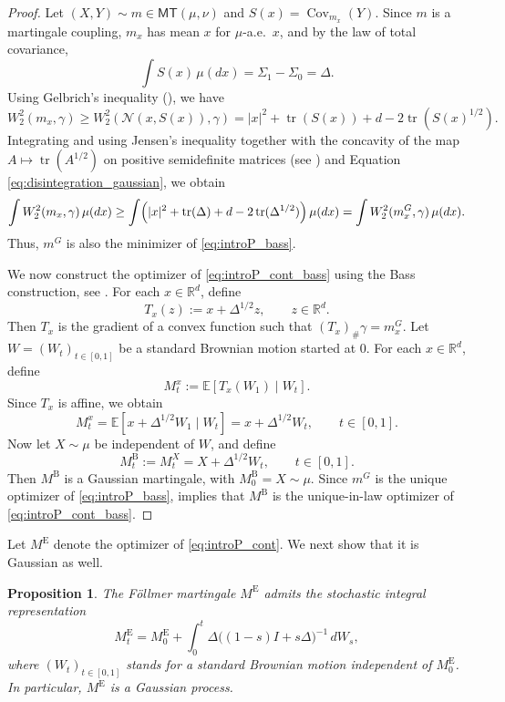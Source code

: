 \documentclass[reqno, a4paper]{amsart}
\DeclareMathOperator{\tr}{tr}
\theoremstyle{plain}
\newtheorem{proposition}[theorem]{Proposition}
\theoremstyle{definition}
\theoremstyle{remark}
\numberwithin{equation}{section}
\numberwithin{theorem}{section}
\newcommand{\R}{\mathbb{R}}
\newcommand{\E}{\mathbb{E}}
\newcommand{\MT}{\mathsf{MT}}
\DeclareMathOperator{\Cov}{Cov}
\begin{document}
	
	\begin{proof}
		Let $(X,Y) \sim m \in\MT(\mu,\nu)$ and $
		S(x)=\Cov_{m_x}(Y)$. %
		Since $m$ is a martingale coupling, $m_x$ has mean $x$ for $\mu$-a.e.\ $x$, and by the law of total covariance,
		\[
		\int S(x)\,\mu(dx)=\Sigma_1-\Sigma_0=\Delta.
		\]
		Using Gelbrich's inequality (\cite[Theorem~2.1]{Ge90}), we have
		\[
		W_2^2(m_x,\gamma)\ge W_2^2(\mathcal N(x,S(x)),\gamma)
		=|x|^2+\tr(S(x))+d-2\tr(S(x)^{1/2}).
		\]
		Integrating and using Jensen's inequality together with the concavity of the map $A\mapsto \tr(A^{1/2})$ on positive semidefinite matrices (see \cite[Theorem~4.2.3]{Bh07}) and Equation \eqref{eq:disintegration_gaussian}, we obtain 
		\[
		\int W_2^2(m_x,\gamma)\,\mu(dx)
		\ge
		\int \Bigl(|x|^2+\tr(\Delta)+d-2\tr(\Delta^{1/2})\Bigr)\,\mu(dx)=\int W_2^2(m_x^G,\gamma)\,\mu(dx).
		\]
		Thus, $m^G$ is also the minimizer of \eqref{eq:introP_bass}.
		
		We now construct the optimizer of \eqref{eq:introP_cont_bass} using the Bass construction, see \cite[Remark~2.3]{BaBeHuKa20}. For each $x\in\R^d$, define
		\[
		T_x(z):=x+\Delta^{1/2}z,
		\qquad z\in\R^d.
		\]
		Then $T_x$ is the gradient of a convex function such that $(T_x)_\#\gamma=m_x^G$.
		Let $W=(W_t)_{t\in[0,1]}$ be a standard Brownian motion started at $0$. For each $x\in\R^d$, define
		\[
		M_t^x:=\E[T_x(W_1)\mid W_t].
		\]
		Since $T_x$ is affine, we obtain
		\[
		M_t^x
		=
		\E[x+\Delta^{1/2}W_1\mid W_t]
		=
		x+\Delta^{1/2}W_t,
		\qquad t\in[0,1].
		\]
		Now let $X\sim\mu$ be independent of $W$, and define
		\[
		M^{\mathrm{B}}_t:=M_t^X=X+\Delta^{1/2}W_t,
		\qquad t\in[0,1].
		\]
		Then $M^{\mathrm{B}}$ is a Gaussian martingale, with
		$M^{\mathrm{B}}_0=X\sim\mu$. Since $m^G$ is the unique optimizer of \eqref{eq:introP_bass}, \cite[Theorem~2.2]{BaBeHuKa20} implies that $M^{\mathrm{B}}$ is the unique-in-law optimizer of \eqref{eq:introP_cont_bass}.
	\end{proof}
	
	
	Let $M^{\mathrm E}$ denote the optimizer of \eqref{eq:introP_cont}. We next show that it is Gaussian as well.
	
	\begin{proposition}\label{pro:computation_gauss_Föllmer}
        The Föllmer martingale $M^{\mathrm E}$ admits the stochastic integral representation
		\begin{equation}\label{eq:M^E_t}
			M_t^{\mathrm E}
			=
			M_0^{\mathrm E}
			+\int_0^t \Delta\bigl((1-s)I+s\Delta\bigr)^{-1}\,dW_s,
		\end{equation}
        where $(W_t)_{t \in [0,1]}$ stands for a standard Brownian motion independent of $M_0^{\mathrm E}$. In particular, $M^{\mathrm E}$ is a Gaussian process.
	\end{proposition}
	
\end{document}
